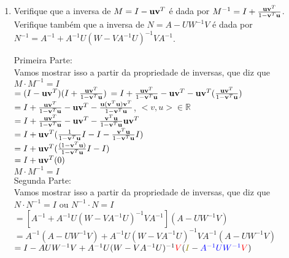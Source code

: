 \documentclass[leqno]{article}
\begin{document}
\begin{enumerate}
		\item Verifique que a inversa de $M = I - \mathbf{u} \mathbf{v}^T$ é dada por $M^{-1} = I + \frac{\mathbf{u}\mathbf{v}^T}{1 - \mathbf{v}^T\mathbf{u}}$. Verifique também que a inversa de $N = A - UW^{-1}V$ é dada por $N^{-1} = A^{-1} + A^{-1}U(W - VA^{-1}U)^{-1}VA^{-1}$.
		
		\begin{sol} 
			Primeira Parte:\\
			Vamos mostrar isso a partir da propriedade de inversas, que diz que $M \cdot M^{-1} = I$\\
			\newline
			$= (I - \mathbf{u} \mathbf{v}^T)(I + \frac{\mathbf{u}\mathbf{v}^T}{1 - \mathbf{v}^T\mathbf{u}})$
			\newline
			$ = I + \frac{\mathbf{u}\mathbf{v}^T}{1 - \mathbf{v}^T\mathbf{u}} - \mathbf{u} \mathbf{v}^T - \mathbf{u} \mathbf{v}^T(\frac{\mathbf{u}\mathbf{v}^T}{1 - \mathbf{v}^T\mathbf{u}})$\\
			\newline
			$ = I + \frac{\mathbf{u}\mathbf{v}^T}{1 - \mathbf{v}^T\mathbf{u}} - \mathbf{u} \mathbf{v}^T - \frac{\mathbf{u}(\mathbf{v}^T\mathbf{u})\mathbf{v}^T}{1 - \mathbf{v}^T\mathbf{u}}$, $<v, u> \in \mathbb{R}$\\
			\newline
			$ = I + \frac{\mathbf{u}\mathbf{v}^T}{1 - \mathbf{v}^T\mathbf{u}} - \mathbf{u} \mathbf{v}^T - \frac{\mathbf{v}^T\mathbf{u}}{1 - \mathbf{v}^T\mathbf{u}}\mathbf{u}\mathbf{v}^T$\\
			\newline
			$ = I + \mathbf{u}\mathbf{v}^T(\frac{1}{1 - \mathbf{v}^T\mathbf{u}}I - I - \frac{\mathbf{v}^T\mathbf{u}}{1 - \mathbf{v}^T\mathbf{u}}I)$\\
			\newline
			$ = I + \mathbf{u}\mathbf{v}^T(\frac{(1 - \mathbf{v}^T\mathbf{u})}{1 - \mathbf{v}^T\mathbf{u}}I - I)$\\
			\newline
			$ = I + \mathbf{u}\mathbf{v}^T(0)$\\
			\newline
			$ M \cdot M^{-1} = I$\\
			\newline
			Segunda Parte:\\
			Vamos mostrar isso a partir da propriedade de inversas, que diz que $N \cdot N^{-1} = I$ ou $N^{-1} \cdot N = I$\\
			\newline
			$= [A^{-1} + A^{-1}U(W - VA^{-1}U)^{-1}VA^{-1}](A - UW^{-1}V)$\\
			\newline
			$= A^{-1}(A - UW^{-1}V) + A^{-1}U(W - VA^{-1}U)^{-1}VA^{-1}(A - UW^{-1}V)$\\
			\newline
			$= I - AUW^{-1}V + A^{-1}U(W - VA^{-1}U)^{-1}\textcolor{red}{V}(\textcolor{olive}{I} - \textcolor{blue}{A^{-1}UW^{-1}}\textcolor{red}{V})$\\

\end{sol}
\end{enumerate}
\end{document}
